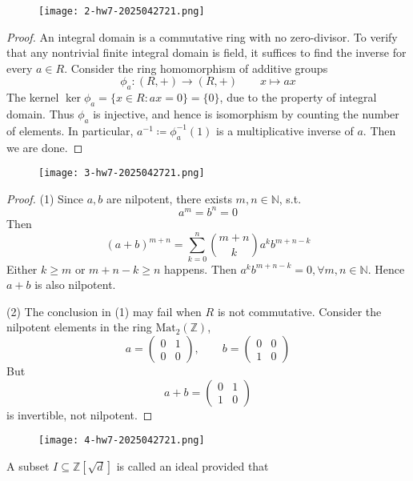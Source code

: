 \begin{exercise}
\begin{figure}[H]
\centering
\texttt{[image: 2-hw7-2025042721.png]}
\label{}
\end{figure}
\end{exercise}
\begin{proof}
An integral domain is a commutative ring with no zero-divisor. To verify that any nontrivial finite integral domain is field, it suffices to find the inverse for every $a\in R$. Consider the ring homomorphism of additive groups
\[
\phi_{a}:(R,+)\to(R,+)\qquad x\mapsto ax
\]
The kernel $\ker \phi_{a}=\{ x\in R:ax=0 \}=\{ 0 \}$, due to the property of integral domain. Thus $\phi_{a}$ is injective, and hence is isomorphism by counting the number of elements. In particular, $a^{-1}\coloneqq \phi ^{-1}_{a}(1)$ is a multiplicative inverse of $a$. Then we are done.
\end{proof}

\begin{exercise}
\begin{figure}[H]
\centering
\texttt{[image: 3-hw7-2025042721.png]}
\label{}
\end{figure}
\end{exercise}
\begin{proof}
(1) Since $a, b$ are nilpotent, there exists $m, n\in \mathbb{N}$, s.t.
\[
a^{m}=b^{n}=0
\]
Then
\[
(a+b)^{m+n}=\sum_{k=0}^{n}{\binom{m+n}{k} }a^{k}b^{m+n-k}
\]
Either $k\geq m$ or $m+n-k\geq n$ happens. Then $a^{k}b^{m+n-k}=0,\forall m, n\in \mathbb{N}$. Hence $a+b$ is also nilpotent.

(2) The conclusion in (1) may fail when $R$ is not commutative. Consider the nilpotent elements in the ring $\mathrm{Mat}_{2}(\mathbb{Z})$,
\[
a=\begin{pmatrix}
0 & 1 \\
0 & 0 
\end{pmatrix},\qquad b=\begin{pmatrix}
0 & 0  \\
1 & 0
\end{pmatrix}
\]
But
\[
a+b=\begin{pmatrix}
0 & 1 \\
1 & 0
\end{pmatrix}
\]
is invertible, not nilpotent.
\end{proof}

\begin{exercise}
\begin{figure}[H]
\centering
\texttt{[image: 4-hw7-2025042721.png]}
\label{}
\end{figure}
\end{exercise}
A subset $I\subseteq\mathbb{Z}[\sqrt{ d }]$ is called an ideal provided that


